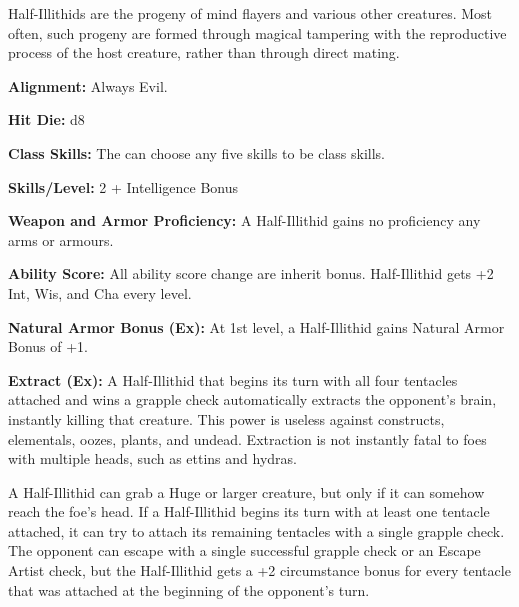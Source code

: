 
Half-Illithids are the progeny of mind flayers and various other creatures. Most often, such progeny are formed through magical tampering with the reproductive process of the host creature, rather than through direct mating.

\textbf{Alignment:} Always Evil.

\textbf{Hit Die:} d8

\textbf{Class Skills:} The \currentclassname{} can choose any five skills to be class skills.

\textbf{Skills/Level:} 2 + Intelligence Bonus

\modebab{}
\poorfor{}
\poorref{}
\goodwil{}

\begin{classtable}
\end{classtable}

\classfeatures

\textbf{Weapon and Armor Proficiency:} A Half-Illithid gains no proficiency any arms or armours.

\textbf{Ability Score:} All ability score change are inherit bonus. Half-Illithid gets +2 Int, Wis, and Cha every level.
 
\textbf{Natural Armor Bonus (Ex):} At 1st level, a Half-Illithid gains Natural Armor Bonus of +1.
 
 \textbf{Extract (Ex):} A Half-Illithid that begins its turn with all four tentacles attached and wins a grapple check automatically extracts the opponent’s brain, instantly killing that creature.
This power is useless against constructs, elementals, oozes, plants, and undead. Extraction is not instantly fatal to foes with multiple heads, such as ettins and hydras.

A Half-Illithid can grab a Huge or larger creature, but only if it can somehow reach the foe’s head. If a Half-Illithid begins its turn with at least one tentacle attached, it can try to attach its remaining tentacles with a single grapple check. The opponent can escape with a single successful grapple check or an Escape Artist check, but the Half-Illithid gets a +2 circumstance bonus for every tentacle that was attached at the beginning of the opponent’s turn.

